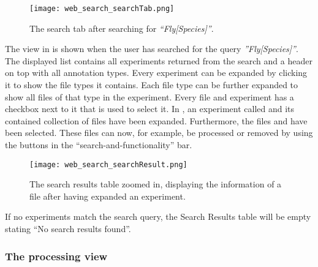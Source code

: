 \begin{figure}[h]
\centering
\texttt{[image: web\_search\_searchTab.png]}
\caption{\label{fig:web_search_searchTab}The search tab after searching for \textit{“Fly[Species]”}.}
\end{figure}

The view in  is shown when the user has searched for the query \textit{”Fly[Species]”}. The displayed list contains all experiments returned from the search and a header on top with all annotation types. Every experiment can be expanded by clicking it to show the file types it contains. Each file type can be further expanded to show all files of that type in the experiment. Every file and experiment has a checkbox next to it that is used to select it. In , an experiment called  and its contained collection of  files have been expanded. Furthermore, the files  and  have been selected. These files can now, for example, be processed or removed by using the buttons in the “search-and-functionality” bar.

\begin{figure}[h]
\centering
\texttt{[image: web\_search\_searchResult.png]}
\caption{\label{fig:web_search_searchResult}The search results table zoomed in, displaying the information of a  file after having expanded an experiment.}
\end{figure}

If no experiments match the search query, the Search Results table will be empty stating “No search results found”.

\pagebreak
\subsubsection{The processing view}

\FloatBarrier

